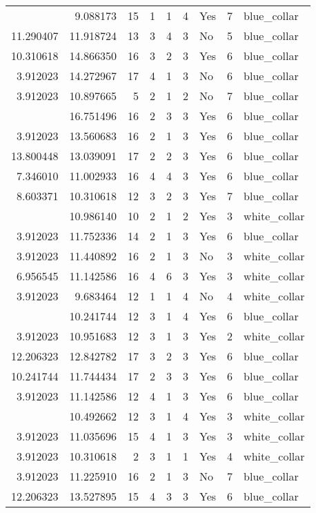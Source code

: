 \documentclass[
]{article}
\begin{document}
\begin{longtable}[t]{rrrrrllrl}
\addlinespace
3.912023 & 9.088173 & 15 & 1 & 1 & 4 & Yes & 7 & blue\_collar\\
11.290407 & 11.918724 & 13 & 3 & 4 & 3 & No & 5 & blue\_collar\\
10.310618 & 14.866350 & 16 & 3 & 2 & 3 & Yes & 6 & blue\_collar\\
3.912023 & 14.272967 & 17 & 4 & 1 & 3 & No & 6 & blue\_collar\\
3.912023 & 10.897665 & 5 & 2 & 1 & 2 & No & 7 & blue\_collar\\
\addlinespace
13.721255 & 16.751496 & 16 & 2 & 3 & 3 & Yes & 6 & blue\_collar\\
3.912023 & 13.560683 & 16 & 2 & 1 & 3 & Yes & 6 & blue\_collar\\
13.800448 & 13.039091 & 17 & 2 & 2 & 3 & Yes & 6 & blue\_collar\\
7.346010 & 11.002933 & 16 & 4 & 4 & 3 & Yes & 6 & blue\_collar\\
8.603371 & 10.310618 & 12 & 3 & 2 & 3 & Yes & 7 & blue\_collar\\
\addlinespace
3.912023 & 10.986140 & 10 & 2 & 1 & 2 & Yes & 3 & white\_collar\\
3.912023 & 11.752336 & 14 & 2 & 1 & 3 & Yes & 6 & blue\_collar\\
3.912023 & 11.440892 & 16 & 2 & 1 & 3 & No & 3 & white\_collar\\
6.956545 & 11.142586 & 16 & 4 & 6 & 3 & Yes & 3 & white\_collar\\
3.912023 & 9.683464 & 12 & 1 & 1 & 4 & No & 4 & white\_collar\\
\addlinespace
3.912023 & 10.241744 & 12 & 3 & 1 & 4 & Yes & 6 & blue\_collar\\
3.912023 & 10.951683 & 12 & 3 & 1 & 3 & Yes & 2 & white\_collar\\
12.206323 & 12.842782 & 17 & 3 & 2 & 3 & Yes & 6 & blue\_collar\\
10.241744 & 11.744434 & 17 & 2 & 3 & 3 & Yes & 6 & blue\_collar\\
3.912023 & 11.142586 & 12 & 4 & 1 & 3 & Yes & 6 & blue\_collar\\
\addlinespace
3.912023 & 10.492662 & 12 & 3 & 1 & 4 & Yes & 3 & white\_collar\\
3.912023 & 11.035696 & 15 & 4 & 1 & 3 & Yes & 3 & white\_collar\\
3.912023 & 10.310618 & 2 & 3 & 1 & 1 & Yes & 4 & white\_collar\\
3.912023 & 11.225910 & 16 & 2 & 1 & 3 & No & 7 & blue\_collar\\
12.206323 & 13.527895 & 15 & 4 & 3 & 3 & Yes & 6 & blue\_collar\\

\end{longtable}
\end{document}
